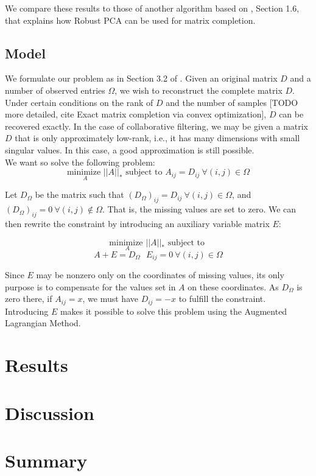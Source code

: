 \documentclass[10pt,conference,compsocconf]{IEEEtran}
\begin{document}
We compare these results to those of another algorithm based on \cite{rpcapaper},
Section 1.6, that explains how Robust PCA can be used for matrix completion. \\

\subsection{Model}

We formulate our problem as in Section 3.2 of \cite{almpaper}. Given an original matrix $D$ and
a number of observed entries $\Omega$, we wish to reconstruct the complete matrix $D$. Under certain
conditions on the rank of $D$ and the number of samples [TODO more detailed, cite Exact matrix completion via convex optimization],
$D$ can be recovered exactly. In the case of collaborative filtering, we may be given a matrix $D$ that is only
approximately low-rank, i.e., it has many dimensions with small singular values. In this case, a good approximation
is still possible. \\

We want so solve the following problem: 
$$ \underset{A}{\text{minimize }} ||A||_* \text{ subject to  } A_{ij} = D_{ij} \ \forall(i, j) \in \Omega$$

Let $D_{\Omega}$ be the matrix such that $(D_{\Omega})_{ij} = D_{ij} \ \forall(i, j) \in \Omega$, and $(D_{\Omega})_{ij} = 0 \ \forall(i, j) \notin \Omega$. That is, the missing values are set to zero. We can then rewrite the constraint by introducing an auxiliary variable matrix $E$:

$$ \underset{A}{\text{minimize }} ||A||_* \text{ subject to  }$$ 
$$A + E = D_{\Omega} \ \ \ E_{ij} = 0 \ \forall(i, j) \in \Omega$$

Since $E$ may be nonzero only on the coordinates of missing values, its only purpose is to compensate for the values set in $A$ on these coordinates. As $D_{\Omega}$ is zero there, if $A_{ij} = x$, we must have $D_{ij} = -x$ to fulfill the constraint. \\

Introducing $E$ makes it possible to solve this problem using the Augmented Lagrangian Method.


\section{Results}


\section{Discussion}



\section{Summary}




\end{document}
